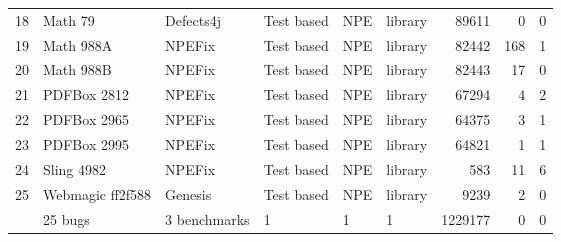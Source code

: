 \begin{table*}
\begin{tabular}{|r|l|l|l|l|l|r||r|r|}
    18 & Math 79 & Defects4j & Test based & NPE & library & 89611 & 0 &  0 \\
    19 & Math 988A & NPEFix & Test based & NPE & library & 82442 & 168 &  1 \\
    20 & Math 988B & NPEFix & Test based & NPE & library & 82443 & 17 &  0  \\
    21 & PDFBox 2812 & NPEFix & Test based & NPE & library & 67294 & 4 &  2 \\
    22 & PDFBox 2965 & NPEFix & Test based & NPE & library & 64375 & 3 &  1 \\
    23 & PDFBox 2995 & NPEFix & Test based & NPE & library & 64821 & 1 &  1 \\
    24 & Sling 4982 & NPEFix & Test based & NPE & library & 583 & 11 &  6 \\
    25 & Webmagic ff2f588 & Genesis & Test based & NPE & library & 9239 & 2 &  0 \\
    \hline
    & 25 bugs & 3 benchmarks & 1 & 1 & 1 & 1229177 & 0 & 0 \\
    \hline
  \end{tabular}
\end{table*}